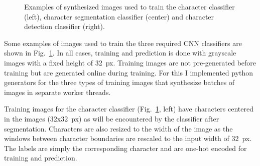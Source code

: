 \documentclass[11pt]{article}
\begin{document}
\begin{figure}[ht!]
  \centering
  \caption
  {
    Examples of synthesized images used to train the character classifier (left), character segmentation
    classifier (center) and character detection classifier (right).
  }
  \label{fig:training_images}
\end{figure}


Some examples of images used to train the three required CNN classifiers are shown in Fig.~\ref{fig:training_images}.
%
In all cases, training and prediction is done with grayscale images with a fixed height of 32~px.
%
Training images are not pre-generated before training but are generated online during training.
%
For this I implemented python generators for the three types of training images that synthesize
batches of images in separate worker threads.
%


Training images for the character classifier (Fig.~\ref{fig:training_images}, left) have characters centered in the images (32x32~px) as will be encountered
by the classifier after segmentation.
%
Characters are also resized to the width of the image as the windows between character boundaries are rescaled to the
input width of 32~px.
%
The labels are simply the corresponding character and are one-hot encoded for training and prediction.
\end{document}

